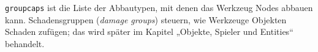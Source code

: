 \begin{Shaded}
\begin{Highlighting}[]
\OperatorTok{(}\OperatorTok{,} \OperatorTok{\{}
     \OperatorTok{=} \OperatorTok{,}
     \OperatorTok{=} \OperatorTok{,}
     \OperatorTok{=} \OperatorTok{\{}
         \OperatorTok{=} \OperatorTok{,}
         \OperatorTok{=} \OperatorTok{,}
         \OperatorTok{=} \OperatorTok{\{}
             \OperatorTok{=} \OperatorTok{\{}
                 \OperatorTok{=} \OperatorTok{,}
                 \OperatorTok{=} \OperatorTok{,}
                 \OperatorTok{=} \OperatorTok{\{} \OperatorTok{[}\OperatorTok{]} \OperatorTok{=} \OperatorTok{,} \OperatorTok{[}\OperatorTok{]} \OperatorTok{=} \OperatorTok{,} \OperatorTok{[}\OperatorTok{]} \OperatorTok{=}  \OperatorTok{\},}
            \OperatorTok{\},}
        \OperatorTok{\},}
         \OperatorTok{=} \OperatorTok{\{}  \OperatorTok{=}  \OperatorTok{\},}
    \OperatorTok{\},}
\OperatorTok{\})}
\end{Highlighting}
\end{Shaded}

\texttt{groupcaps} ist die Liste der Abbautypen, mit denen das Werkzeug
Nodes abbauen kann. Schadensgruppen
(\emph{damage groups}) steuern, wie Werkzeuge Objekten Schaden zufügen;
das wird später im Kapitel „Objekte, Spieler und
Entities`` behandelt.
